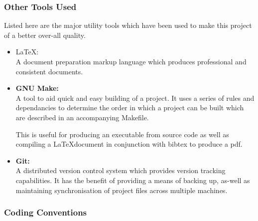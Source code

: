 \subsubsection*{Other Tools Used}

Listed here are the major utility tools which have been used to make this project of a better over-all 
quality. 

\begin{itemize}
\item \LaTeX: \\   
            A document preparation markup language which produces professional and consistent 
            documents. 

\item \textbf{GNU Make:} \\ 
            A tool to aid quick and easy building of a project. It uses a series of 
            rules and dependancies to determine the order in which a project can be built 
            which are described in an accompanying Makefile. 
                         
            This is useful for  producing an executable from source code as well
            as compiling a \LaTeX  document in conjunction with bibtex to produce a pdf.

\item \textbf{Git:} \\     
            A distributed version control system which provides version tracking capabilities. 
            It has the benefit of providing a means of backing up, as-well as maintaining 
            synchronisation of project files across multiple machines.
\end{itemize}

\subsubsection*{Coding Conventions}

